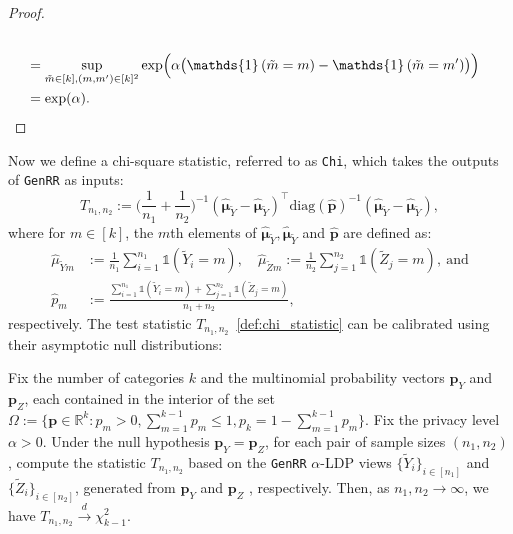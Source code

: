 \documentclass[twoside,11pt]{article}
\newcommand{\indicator}[1]{\mathds{1}\left( #1 \right) }%
\newcommand{\rvTwo}{Y}
\newcommand{\rvThree}{Z}
\newcommand{\rvY}{Y}
\newcommand{\rvZ}{Z}
\newcommand{\alphabetSize}{k} %
\newcommand{\vectorIndex}{m}
\newcommand{\sampleSize}{n}
\newcommand{\probVec}{\mathbf{p}} %
\newcommand{\privacyParameter}{\alpha} %
\begin{document}
\begin{appendix}
\begin{proof}
\begin{align*}
{			}
			\\&=
			\sup_{\tilde{m} \in [k], (m, m')\in [k]^2}
			\exp \Bigl( \alpha 
			\bigl(
			\indicator{	\tilde{m} = m}
			-
			\indicator{	\tilde{m} = m'}
			\bigr)
			\Bigr)
			\\&= 
			\exp(\privacyParameter).
		\end{align*}
	\end{proof}
	Now we define a chi-square statistic, referred to as \texttt{Chi}, 
	which takes the outputs of \texttt{GenRR}  as inputs:
	\begin{equation}\label{def:chi_statistic}
		T_{\sampleSize_1, \sampleSize_2}
		:=
		\biggl( \dfrac{1}{\sampleSize_1}+\dfrac{1}{\sampleSize_2} \biggr)^{-1}
		(
		\hat{\boldsymbol{\mu}}_{\tilde{\rvY}}
		-
		\hat{\boldsymbol{\mu}}_{\tilde{\rvY}}
		)^\top
		\mathrm{diag}(
		\hat{\probVec}
		)^{-1}
		(
		\hat{\boldsymbol{\mu}}_{\tilde{\rvY}}
		-
		\hat{\boldsymbol{\mu}}_{\tilde{\rvY}}
		),
	\end{equation}
	where for $\vectorIndex \in  [\alphabetSize]$,
	the $\vectorIndex$th elements of $\hat{\boldsymbol{\mu}}_{\tilde{\rvY}}, \hat{\boldsymbol{\mu}}_{\tilde{\rvY}}$ and $\hat{\probVec}$ are defined as:
	\begin{align*}
		\hat{\mu}_{\tilde{\rvTwo} \vectorIndex}
		&:=
		\frac{1}{\sampleSize_1}
		\sum_{i=1}^{n_1}
		\mathds{1}
		({\tilde{\rvY}_i=\vectorIndex}),
		\quad
		\hat{\mu}_{\tilde{\rvThree} \vectorIndex}
		:=
		\frac{1}{\sampleSize_2}
		\sum_{j=1}^{n_2}
		\mathds{1}
		({\tilde{\rvZ}_j=\vectorIndex}),~\text{and}
		\\
		\hat{p}_\vectorIndex
		&:=
		\frac{
			\sum_{i=1}^{n_1}
			\mathds{1}
			({\tilde{\rvY}_i=\vectorIndex})
			+
			\sum_{j=1}^{n_2}
			\mathds{1}
			({\tilde{\rvZ}_j=\vectorIndex})
		}{\sampleSize_1 + \sampleSize_2},
	\end{align*}
	respectively.
	The test statistic $T_{\sampleSize_1, \sampleSize_2}$~\eqref{def:chi_statistic} can  be calibrated using their asymptotic null distributions:
	\begin{lemma} \label{asymp_genrr_chi}
		Fix the number of categories $\alphabetSize$ and the multinomial probability vectors $\mathbf{p}_Y$ and $\mathbf{p}_Z$, each contained in the interior of the set $\Omega := \{\mathbf{p} \in \mathbb{R}^k : p_\vectorIndex > 0, \sum_{m=1}^{k-1} p_m \leq 1, p_{k} = 1 - \sum_{m=1}^{k-1} p_m\}$. Fix the privacy level $\privacyParameter > 0$. 
		Under the null hypothesis $\mathbf{p}_Y = \mathbf{p}_Z$, for each pair of sample sizes $(n_1, n_2)$, compute the statistic $T_{n_1, n_2}$ based on the  \textnormal{\texttt{GenRR}} $\privacyParameter$-LDP views $\{\tilde{Y}_i\}_{i \in [n_1]}$ and $\{\tilde{Z}_i\}_{i \in [n_2]}$, generated from $\mathbf{p}_Y$ and $\mathbf{p}_Z$ , respectively. Then, as $n_1, n_2 \to \infty$, we have $T_{n_1, n_2} \stackrel{d}{\to} \chi^2_{\alphabetSize-1}$.

\end{lemma}
\end{appendix}
\end{document}
